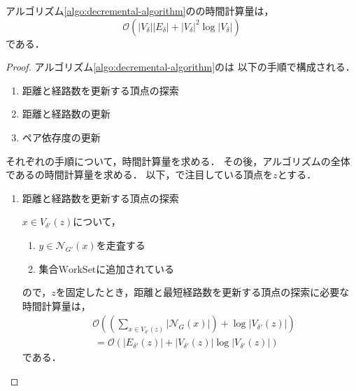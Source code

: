 \begin{lemma}
  アルゴリズム\ref{algo:decremental-algorithm}のの時間計算量は，
  \[ \mathcal{O}(\lvert V_\delta\rvert\lvert E_\delta\rvert
  +\lvert V_\delta\rvert^2\log \lvert V_\delta\rvert) \]
  である．
\end{lemma}
\begin{proof}
  アルゴリズム\ref{algo:decremental-algorithm}のは
  以下の手順で構成される．
  \begin{enumerate}[label=(\alph*)]
  \item 距離と経路数を更新する頂点の探索
  \item 距離と経路数の更新
  \item ペア依存度の更新
  \end{enumerate}
  それぞれの手順について，時間計算量を求める．
  その後，アルゴリズムの全体であるの時間計算量を求める．
  以下，で注目している頂点を$z$とする．

  \begin{enumerate}[label=(\alph*)]
  \item 距離と経路数を更新する頂点の探索
    \par $x\in V_{\delta'}(z)$について，
    \begin{enumerate}[label=\arabic*.]
    \item $y\in\mathcal{N}_{G'}(x)$を走査する
    \item 集合$\text{WorkSet}$に追加されている
    \end{enumerate}
    ので，$z$を固定したとき，距離と最短経路数を更新する頂点の探索に必要な時間計算量は，
    \begin{equation}
      \begin{aligned}
        &\mathcal{O}(\left(\sum_{x\in V_{\delta'}(z)}\lvert\mathcal{N}_G(x)\rvert\right)
        +\log\lvert V_{\delta'}(z)\rvert) \nonumber\\
        &\:=\mathcal{O}(\lvert E_{\delta'}(z)\rvert
        +\lvert V_{\delta'}(z)\rvert\log\lvert V_{\delta'}(z)\rvert) \nonumber
      \end{aligned}
    \end{equation}
    である．


\end{enumerate}
\end{proof}
